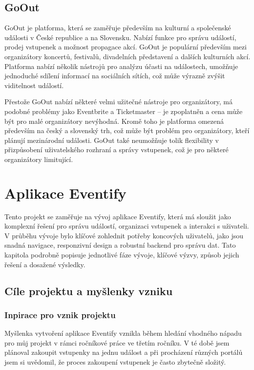\documentclass[12pt, a4paper,
twoside,        %
openright
]{report}
\begin{document}
\subsection{GoOut}
GoOut je platforma, která se zaměřuje především na kulturní a společenské události v České republice a na Slovensku. Nabízí funkce pro správu událostí, prodej vstupenek a možnost propagace akcí. GoOut je populární především mezi organizátory koncertů, festivalů, divadelních představení a dalších kulturních akcí. Platforma nabízí několik nástrojů pro analýzu účasti na událostech, umožňuje jednoduché sdílení informací na sociálních sítích, což může výrazně zvýšit viditelnost událostí.

Přestože GoOut nabízí některé velmi užitečné nástroje pro organizátory, má podobné problémy jako Eventbrite a Ticketmaster – je zpoplatněn a cena může být pro malé organizátory nevýhodná. Kromě toho je platforma omezená především na český a slovenský trh, což může být problém pro organizátory, kteří plánují mezinárodní události. GoOut také neumožňuje tolik flexibility v přizpůsobení uživatelského rozhraní a správy vstupenek, což je pro některé organizátory limitující.

\clearpage

\section{Aplikace Eventify}

Tento projekt se zaměřuje na vývoj aplikace Eventify, která má sloužit jako komplexní řešení pro správu událostí, organizaci vstupenek a interakci s uživateli. V průběhu vývoje bylo klíčové zohlednit potřeby koncových uživatelů, jako jsou snadná navigace, responzivní design a robustní backend pro správu dat. Tato kapitola podrobně popisuje jednotlivé fáze vývoje, klíčové výzvy, způsob jejich řešení a dosažené výsledky.

\subsection{Cíle projektu a myšlenky vzniku}

\subsubsection{Inpirace pro vznik projektu}

Myšlenka vytvoření aplikace Eventify vznikla během hledání vhodného nápadu pro můj projekt v rámci ročníkové práce ve třetím ročníku. V té době jsem plánoval zakoupit vstupenky na jednu událost a při procházení různých portálů jsem si uvědomil, že proces zakoupení vstupenek je často zbytečně složitý.
\end{document}
